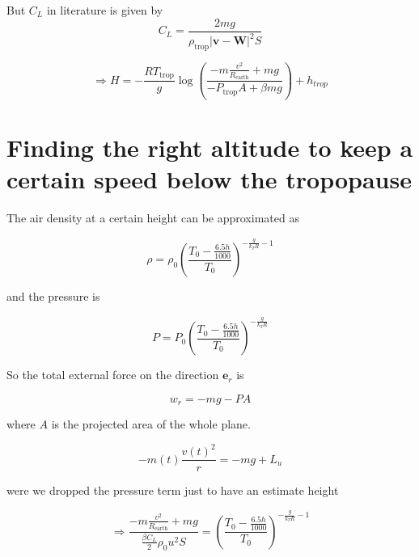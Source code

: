 \documentclass{article}
\renewcommand{\vec}[1]{\boldsymbol{#1}}
\begin{document}
 But $C_L$ in literature is given by
\begin{equation}
    C_L= \frac{2mg}{\rho_{\text{trop}} |\vec v-\vec W|^2S}
\end{equation}

\begin{equation}
    \Rightarrow H= - \frac{RT_{\text{trop}}}{g}\log \left(\frac{-m\frac{v^2}{R_{\text{earth}}} +mg}{-  P_{\text{trop}}A +\beta mg }\right)+h_{trop}
\end{equation}

\section{Finding the right altitude to keep a certain speed below the tropopause}

The air density at a certain height can be approximated as

\begin{equation}
    \rho= \rho_0 \left(\frac{T_0-\frac{6.5h}{1000}}{T_0}\right)^{-\frac{g}{k_TR}-1}
\end{equation}

and the pressure is 

\begin{equation}
    P=P_0\left(\frac{T_0-\frac{6.5h}{1000}}{T_0}\right)^{-\frac{g}{k_TR}}
\end{equation}

So the total external force on the direction $\vec{e}_r$ is 

\begin{equation}
    w_r=-mg -PA 
\end{equation}

where $A$ is the projected area of the whole plane.

\begin{equation}
    -m(t)\frac{v(t)^2}{r}=-mg+ L_u
\end{equation}

were we dropped the pressure term just to have an estimate height

\begin{equation}
  \Rightarrow \frac{-m\frac{v^2}{R_{\text{earth}}} +mg}{\frac{\beta C_L}{2} \rho_0 u^2S}=  \left(\frac{T_0-\frac{6.5h}{1000}}{T_0}\right)^{-\frac{g}{k_TR}-1}    
\end{equation}

\printbibliography
\end{document}
